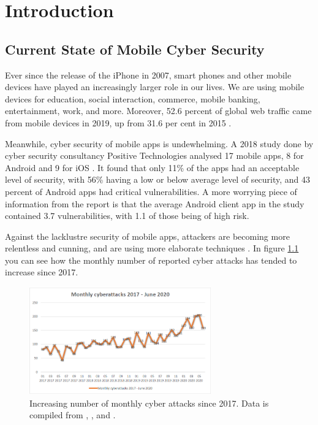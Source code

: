 \chapter{Introduction}
	\label{chap:intro}
	
	\section{Current State of Mobile Cyber Security}
		\label{sec:intro_motivation} 
		
		Ever since the release of the iPhone in 2007, smart phones and other mobile devices have played an increasingly larger role in our lives. We are using mobile devices for education, social interaction, commerce, mobile banking, entertainment, work, and more. Moreover, 52.6 percent of global web traffic came from mobile devices in 2019, up from 31.6 per cent in 2015 \cite{statista_mobile_web_traffic}. 
		
		Meanwhile, cyber security of mobile apps is undewhelming. A 2018 study done by cyber security consultancy Positive Technologies analysed 17 mobile apps, 8 for Android and 9 for iOS \cite{pt_mobile_apps_2019}. It found that only 11\% of the apps had an acceptable level of security, with 56\% having a low or below average level of security, and 43 percent of Android apps had critical vulnerabilities. A more worrying piece of information from the report is that the average Android client app in the study contained 3.7 vulnerabilities, with 1.1 of those being of high risk.
		
		Against the lacklustre security of mobile apps, attackers are becoming more relentless and cunning, and are using more elaborate techniques \cite{pt_threatscape_2018}. In figure \ref{fig:no_attacks_evolution} you can see
		how the monthly number of reported cyber attacks has tended to increase since 2017.
		
		\begin{figure}[h]
            \centering
            \includegraphics[width=0.7\textwidth]{graphics/threatscape_chart.PNG}
            \caption{Increasing number of monthly cyber attacks since 2017. Data is compiled from \cite{pt_threatscape_2018}, \cite{pt_threatscape_2019}, \cite{pt_threatscape_2020} and              \cite{pt_threatscape_2020q2}.}
            \label{fig:no_attacks_evolution}
        \end{figure}
		
